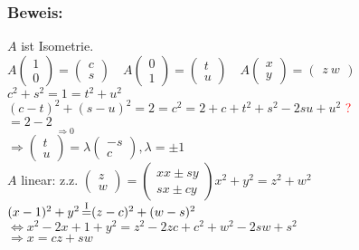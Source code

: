 \subsubsection{Beweis:}
$A$ ist Isometrie.\\
$A\begin{pmatrix} 1 \\ 0 \end{pmatrix} = \begin{pmatrix} c \\ s \end{pmatrix}  \quad A\begin{pmatrix} 0 \\ 1 \end{pmatrix} = \begin{pmatrix} t \\ u \end{pmatrix} \quad A\begin{pmatrix} x \\ y \end{pmatrix} = \begin{pmatrix} z \ w \end{pmatrix}$\\
$ c^{2}+s^{2}=1=t^{2}+u^{2}$\\
$(c-t)^{2} + (s-u)^{2} = 2 = c^{2}  = 2 + c + t^{2} + s^{2} - 2su+u^{2}$ \Huge{\textcolor{red}{?}}\normalsize{} \\
$=2-2\mathop{\underbrace{(tc+su)}}\limits_{\Rightarrow 0 }$\\
$\Rightarrow \begin{pmatrix} t \\ u \end{pmatrix} = \lambda \begin{pmatrix} -s \\ c \end{pmatrix}, \lambda = \pm 1$\\
$A$ linear: z.z. $\begin{pmatrix}z \\ w \end{pmatrix} = \begin{pmatrix} xx \pm sy \\ sx \pm cy \end{pmatrix} x^{2}+y^{2} = z^{2} + w^{2}$\\
$(x-1)^{2} + y^{2} \mathop{=}\limits^{\text{\RM{1}}} ( z-c)^{2} + (w-s)^{2}$\\
$\Leftrightarrow x^{2}-2x+1+y^{2} = z^{2}-2zc+c^{2}+w^{2}-2sw+s^{2}$\\
$\Rightarrow x= cz + sw$\\
